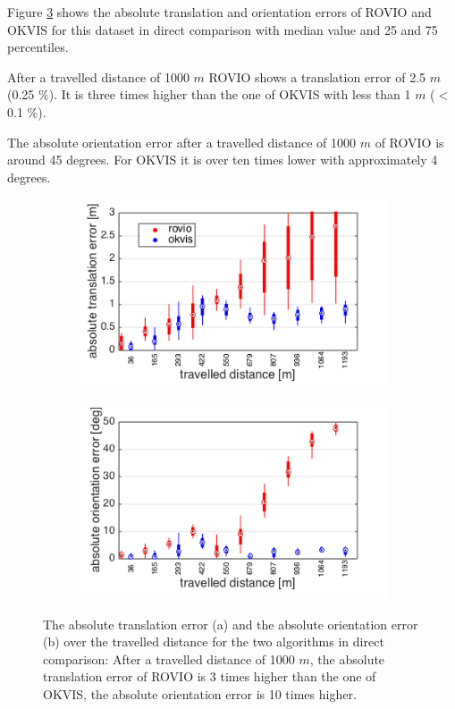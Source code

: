 Figure \ref{pics:ijrr_abs} shows the absolute translation and orientation errors of ROVIO and OKVIS for this dataset in direct comparison with median value and 25 and 75 percentiles.

After a travelled distance of 1000 $m$ ROVIO shows a translation error of 2.5 $m$ (0.25 $\%$). It is three times higher than the one of OKVIS with less than 1 $m$ ($<$0.1 $\%$). 

The absolute orientation error after a travelled distance of 1000 $m$ of ROVIO is around 45 degrees. For OKVIS it is over ten times lower with approximately 4 degrees. \\

\begin{figure}[h]
  \begin{subfigure}[b]{0.48\textwidth}
    \includegraphics[width=\textwidth]{images/ijrr/ate.png}
    \caption{}
    \label{fig:2}
  \end{subfigure}
  \hfill
  \begin{subfigure}[b]{0.48\textwidth}
    \includegraphics[width=\textwidth]{images/ijrr/aoe.png}
    \caption{}
    \label{fig:2}
  \end{subfigure}
   \caption{The absolute translation error (a) and the absolute orientation error (b) over the travelled distance for the two algorithms in direct comparison: After a travelled distance of 1000 $m$, the absolute translation error of ROVIO is 3 times higher than the one of OKVIS, the absolute orientation error is 10 times higher.}
   \label{pics:ijrr_abs}
\end{figure}

